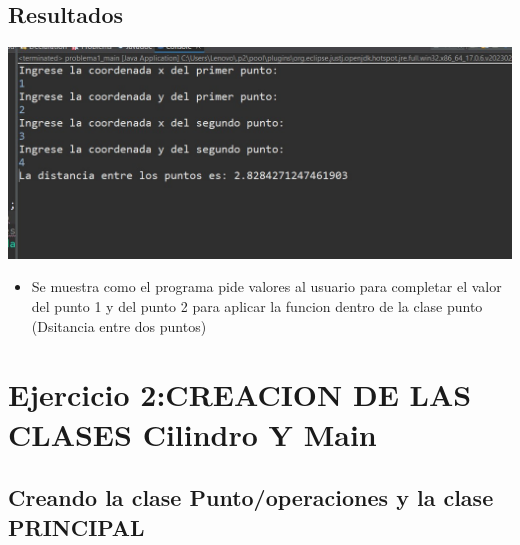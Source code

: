 \documentclass{article}
\begin{document}
	\subsection{Resultados}
	
\includegraphics[scale=0.35]{img/captura1.jpeg} 	
	\begin{itemize}	
		\item Se muestra como el programa pide valores al usuario para completar el valor del punto 1 y del punto 2 para aplicar la funcion dentro de la clase punto (Dsitancia entre dos puntos)
	\end{itemize}
	
		\section{Ejercicio 2:CREACION DE LAS CLASES Cilindro Y Main}
	
	\subsection{Creando la clase Punto/operaciones y la clase PRINCIPAL}
		
\end{document}
